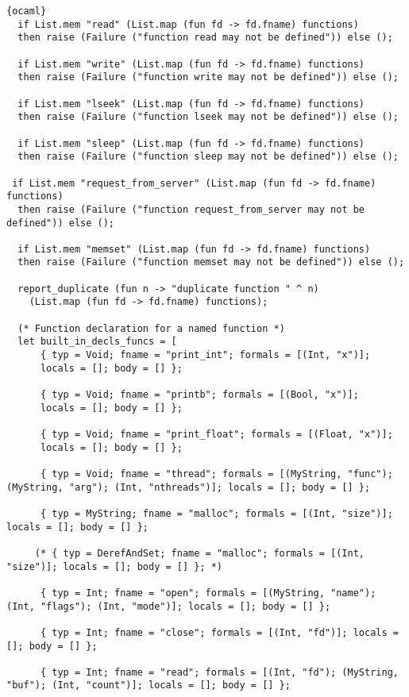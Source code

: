 \begin{lstlisting}{ocaml}
  if List.mem "read" (List.map (fun fd -> fd.fname) functions)
  then raise (Failure ("function read may not be defined")) else ();

  if List.mem "write" (List.map (fun fd -> fd.fname) functions)
  then raise (Failure ("function write may not be defined")) else ();

  if List.mem "lseek" (List.map (fun fd -> fd.fname) functions)
  then raise (Failure ("function lseek may not be defined")) else ();

  if List.mem "sleep" (List.map (fun fd -> fd.fname) functions)
  then raise (Failure ("function sleep may not be defined")) else ();
 
 if List.mem "request_from_server" (List.map (fun fd -> fd.fname) functions)
  then raise (Failure ("function request_from_server may not be defined")) else ();

  if List.mem "memset" (List.map (fun fd -> fd.fname) functions)
  then raise (Failure ("function memset may not be defined")) else ();

  report_duplicate (fun n -> "duplicate function " ^ n)
    (List.map (fun fd -> fd.fname) functions);

  (* Function declaration for a named function *)
  let built_in_decls_funcs = [
      { typ = Void; fname = "print_int"; formals = [(Int, "x")];
      locals = []; body = [] };

      { typ = Void; fname = "printb"; formals = [(Bool, "x")];
      locals = []; body = [] }; 

      { typ = Void; fname = "print_float"; formals = [(Float, "x")];
      locals = []; body = [] }; 

      { typ = Void; fname = "thread"; formals = [(MyString, "func"); (MyString, "arg"); (Int, "nthreads")]; locals = []; body = [] };

      { typ = MyString; fname = "malloc"; formals = [(Int, "size")]; locals = []; body = [] };

     (* { typ = DerefAndSet; fname = "malloc"; formals = [(Int, "size")]; locals = []; body = [] }; *)

      { typ = Int; fname = "open"; formals = [(MyString, "name"); (Int, "flags"); (Int, "mode")]; locals = []; body = [] };

      { typ = Int; fname = "close"; formals = [(Int, "fd")]; locals = []; body = [] };

      { typ = Int; fname = "read"; formals = [(Int, "fd"); (MyString, "buf"); (Int, "count")]; locals = []; body = [] };


\end{lstlisting}

